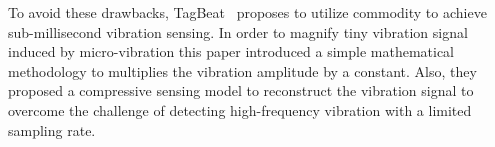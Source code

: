 To avoid these drawbacks, TagBeat~\cite{Tagbeat} proposes to utilize commodity \RFID to achieve sub-millisecond vibration sensing. In order
to magnify tiny vibration signal induced by micro-vibration this paper introduced a simple mathematical methodology to multiplies the
vibration amplitude by a constant. Also, they proposed a compressive sensing model to reconstruct the vibration signal to overcome the
challenge of detecting high-frequency vibration with a limited sampling rate.

%
